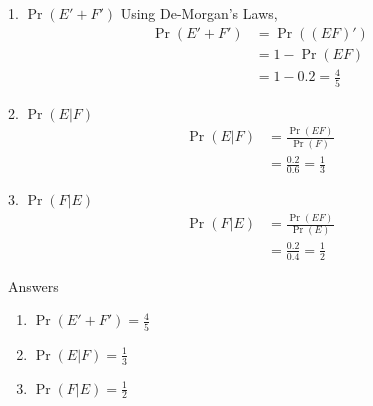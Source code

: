 \documentclass{beamer}
\providecommand{\pr}[1]{\ensuremath{\Pr\left(#1\right)}}
\begin{document}
\begin{frame}
	\begin{block}{1. $\pr{E' + F'}$}
		Using De-Morgan's Laws,
		\begin{align}
			\pr{E' + F'} &= \pr{(EF)'} \\
			&= 1 - \pr{EF} \\
			&= 1 - 0.2 = \frac{4}{5}
			\label{sol1}		
		\end{align}
	\end{block}
	\begin{block}{2. $\pr{E|F}$}
		\begin{align}
			\pr{E|F} &= \frac{\pr{EF}}{\pr{F}} \\
			&= \frac{0.2}{0.6} = \frac{1}{3}
			\label{sol2}		
		\end{align}
	\end{block}
\end{frame}

\begin{frame}
	\begin{block}{3. $\pr{F|E}$}
		\begin{align}
			\pr{F|E} &= \frac{\pr{EF}}{\pr{E}} \\
			&= \frac{0.2}{0.4} = \frac{1}{2}
			\label{sol3}
		\end{align}
	\end{block}
	\begin{alertblock}{Answers}
    		\begin{enumerate}
    			\item $\pr{E' + F'} = \frac{4}{5}$
    			\item $\pr{E|F} = \frac{1}{3}$
    			\item $\pr{F|E} = \frac{1}{2}$
    		\end{enumerate}
    \end{alertblock}
\end{frame}
\end{document}
